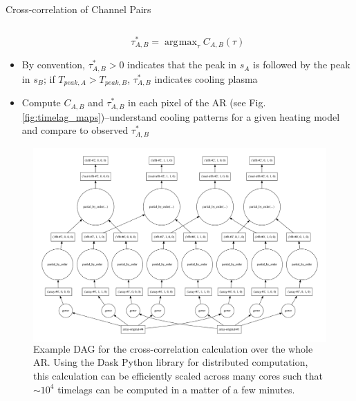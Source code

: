 \documentclass[final]{beamer}
\DeclareMathOperator*{\argmax}{\arg\!\max}
\begin{document}
\begin{frame}
\begin{columns}[T]
\begin{column}{0.49\linewidth}
\begin{block}{Cross-correlation of Channel Pairs}
\begin{columns}[c]
\begin{column}{0.49\columnwidth}
\begin{itemize}
                    \begin{equation}
                        \tau^*_{A,B} = \argmax_{\tau}C_{A,B}(\tau)
                    \end{equation}
                    \item By convention, $\tau^*_{A,B}>0$ indicates that the peak in $s_A$ is followed by the peak in $s_B$; if $T_{peak,A}>T_{peak,B}$, $\tau^*_{A,B}$ indicates \alert{cooling} plasma
                    \item Compute $C_{A,B}$ and $\tau^*_{A,B}$ in each pixel of the AR (see Fig. \ref{fig:timelag_maps})--understand cooling patterns for a given heating model and compare to observed $\tau^*_{A,B}$
                \end{itemize}
                \begin{figure}
                    \begin{columns}[c]
                        \includegraphics[width=\columnwidth]{figures/timelag_dag.pdf}
                        \caption{Example DAG for the cross-correlation calculation over the whole AR. Using the Dask Python library \citep{dask_development_team_dask:_2016} for distributed computation, this calculation can be efficiently scaled across many cores such that $\sim10^4$ timelags can be computed in a matter of a few minutes.}
                    \end{columns}
                    \label{fig:timelag_dask_dag}
                \end{figure}
            \end{column}
        \end{columns}

\end{block}
\end{column}
\end{columns}
\end{frame}
\end{document}

